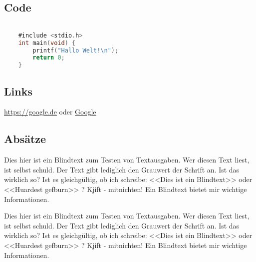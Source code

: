 \subsection{Code}\label{code}

\begin{lstlisting}[language=C,caption={},%label={code:}% C, TeX, Bash, Python
]%--- Code einfügen

    #include <stdio.h>
    int main(void) {
        printf("Hallo Welt!\n");
        return 0;
    }
\end{lstlisting}

\subsection{Links}\label{links}

\url{https://google.de} oder \href{https://google.de}{Google}

\subsection{Absätze}\label{absaetze}

Dies hier ist ein Blindtext zum Testen von Textausgaben. Wer diesen Text
liest, ist selbst schuld. Der Text gibt lediglich den Grauwert der
Schrift an. Ist das wirklich so? Ist es gleichgültig, ob ich schreibe:
<<Dies ist ein Blindtext>>  oder <<Huardest gefburn>> ? Kjift -
mitnichten! Ein Blindtext bietet mir wichtige Informationen.

Dies hier ist ein Blindtext zum Testen von Textausgaben. Wer diesen Text
liest, ist selbst schuld. Der Text gibt lediglich den Grauwert der
Schrift an. Ist das wirklich so? Ist es gleichgültig, ob ich schreibe:
<<Dies ist ein Blindtext>>  oder <<Huardest gefburn>> ? Kjift -
mitnichten! Ein Blindtext bietet mir wichtige Informationen.

